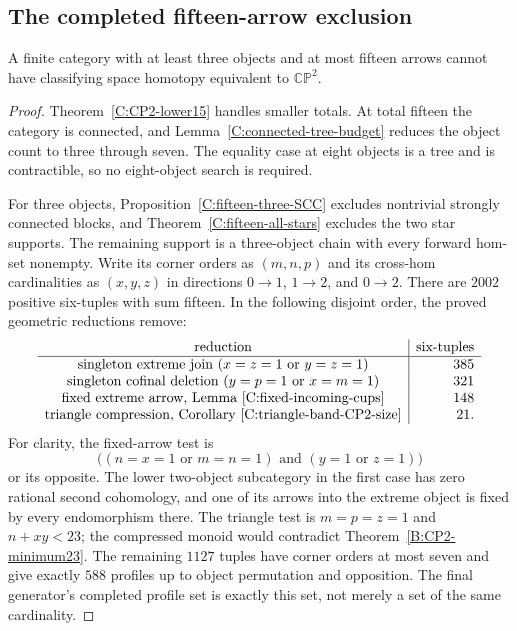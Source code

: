 \subsection{The completed fifteen-arrow exclusion}

\begin{theorem}
\label{C:fifteen-many-objects}
A finite category with at least three objects and at most fifteen
arrows cannot have classifying space homotopy equivalent to
$\mathbb {CP}^2$.
\end{theorem}
\begin{proof}
Theorem~\ref{C:CP2-lower15} handles smaller totals.  At total
fifteen the category is connected, and
Lemma~\ref{C:connected-tree-budget} reduces the object count to
three through seven.  The equality case at eight objects is
a tree and is contractible, so no eight-object search is required.

For three objects, Proposition~\ref{C:fifteen-three-SCC} excludes
nontrivial strongly connected blocks, and
Theorem~\ref{C:fifteen-all-stars} excludes the two star supports.
The remaining support is a three-object chain with every forward
hom-set nonempty.  Write its corner orders as $(m,n,p)$ and its
cross-hom cardinalities as $(x,y,z)$ in directions $0\to1$,
$1\to2$, and $0\to2$.  There are $2002$ positive six-tuples
with sum fifteen.  In the following disjoint order, the proved
geometric reductions remove:
\[
\begin{array}{c|r}
\text{reduction}&\text{six-tuples}\\\hline
\text{singleton extreme join }(x=z=1\text{ or }y=z=1)&385\\
\text{singleton cofinal deletion }(y=p=1\text{ or }x=m=1)&321\\
\text{fixed extreme arrow, Lemma~\ref{C:fixed-incoming-cups}}&148\\
\text{triangle compression, Corollary~\ref{C:triangle-band-CP2-size}}&21.
\end{array}
\]
For clarity, the fixed-arrow test is
\[
 \bigl((n=x=1\text{ or }m=n=1)\text{ and }(y=1\text{ or }z=1)\bigr)
\]
or its opposite.  The lower two-object subcategory in the first
case has zero rational second cohomology, and one of its arrows
into the extreme object is fixed by every endomorphism there.
The triangle test is $m=p=z=1$ and $n+xy<23$; the compressed
monoid would contradict Theorem~\ref{B:CP2-minimum23}.
The remaining $1127$ tuples have corner orders at most seven
and give exactly $588$ profiles up to object permutation and
opposition.  The final generator's completed profile set is
exactly this set, not merely a set of the same cardinality.


\end{proof}
